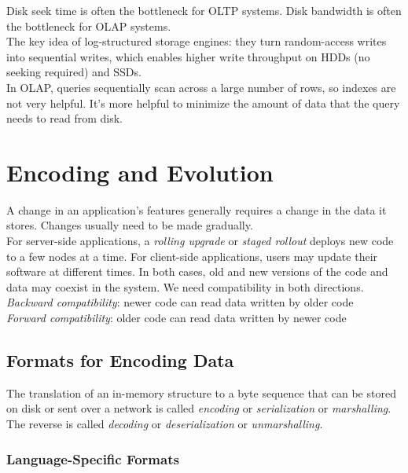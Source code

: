 \documentclass[12pt, titlepage]{article}
\begin{document}
Disk seek time is often the bottleneck for OLTP systems. Disk bandwidth is often the bottleneck for OLAP systems. \\

The key idea of log-structured storage engines: they turn random-access writes into sequential writes, which enables higher write throughput on HDDs (no seeking required) and SSDs. \\

In OLAP, queries sequentially scan across a large number of rows, so indexes are not very helpful. It's more helpful to minimize the amount of data that the query needs to read from disk.

\section{Encoding and Evolution}

A change in an application's features generally requires a change in the data it stores. Changes usually need to be made gradually. \\

For server-side applications, a \textit{rolling upgrade} or \textit{staged rollout} deploys new code to a few nodes at a time. For client-side applications, users may update their software at different times. In both cases, old and new versions of the code and data may coexist in the system. We need compatibility in both directions. \\

\textit{Backward compatibility}: newer code can read data written by older code \\
\textit{Forward compatibility}: older code can read data written by newer code

\subsection{Formats for Encoding Data}

The translation of an in-memory structure to a byte sequence that can be stored on disk or sent over a network is called \textit{encoding} or \textit{serialization} or \textit{marshalling}. The reverse is called \textit{decoding} or \textit{deserialization} or \textit{unmarshalling}.

\subsubsection{Language-Specific Formats}
\end{document}
